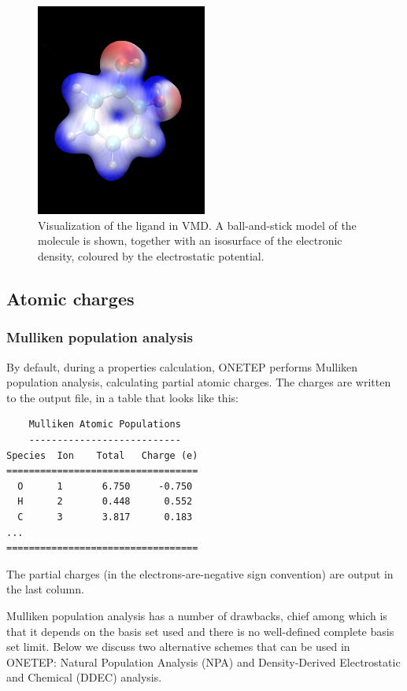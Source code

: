 \documentclass{article}
\begin{document}
\begin{figure}[hbtp]
    \centering
    \includegraphics[width=0.5\textwidth]{vmdscene.dat.png}
    \caption{Visualization of the ligand in VMD. A ball-and-stick model of the molecule is shown, together with an isosurface of the electronic density, coloured by the electrostatic potential.}
    \label{fig:denspot}
\end{figure}

\newpage
\subsection{Atomic charges}
\subsubsection{Mulliken population analysis}
By default, during a properties calculation, ONETEP performs Mulliken population analysis, calculating partial atomic charges. The charges are written to the output file, in a table that looks like this:

\begin{verbatim}
    Mulliken Atomic Populations
    ---------------------------
Species  Ion    Total   Charge (e)
==================================
  O      1       6.750     -0.750
  H      2       0.448      0.552
  C      3       3.817      0.183
...
==================================
\end{verbatim}

The partial charges (in the electrons-are-negative sign convention) are output in the last column.

Mulliken population analysis has a number of drawbacks, chief among which is that it depends on the basis set used and there is no well-defined complete basis set limit. Below we discuss two alternative schemes that can be used in ONETEP: Natural Population Analysis (NPA) and Density-Derived Electrostatic and Chemical (DDEC) analysis.
\end{document}
